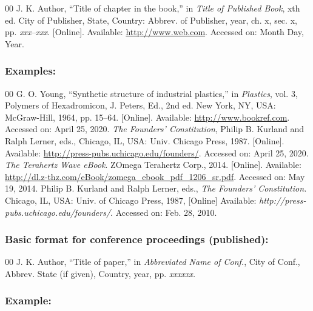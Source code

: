 \begin{thebibliography}{00}
 J. K. Author, ``Title of chapter in the book,'' in \textit{Title of Published Book}, xth ed. City of
Publisher, State, Country: Abbrev. of Publisher, year, ch. x, sec. x, pp.
\textit{xxx--xxx}. [Online]. Available: \underline {http://www.web.com}. Accessed on: Month
Day, Year.
\end{thebibliography}

\subsubsection*{Examples:}

\begin{thebibliography}{00}
 G. O. Young, ``Synthetic structure of industrial
plastics,'' in \emph{Plastics}, vol. 3, Polymers of Hexadromicon, J.
Peters, Ed., 2nd ed. New York, NY, USA: McGraw-Hill, 1964, pp. 15--64.
[Online]. Available: \underline{http://www.bookref.com}. Accessed on: April 25, 2020.
 \textit{The Founders' Constitution}, Philip B. Kurland and Ralph Lerner, eds., Chicago, IL, USA: Univ. Chicago Press, 1987. [Online]. Available: \underline {http://press-pubs.uchicago.edu/founders/}. Accessed on: April 25, 2020.
 \emph{The Terahertz Wave eBook}. ZOmega Terahertz
Corp., 2014. [Online]. Available: \underline{http://dl.z-thz.com/eBook/zomega\_ebook\_pdf\_1206\_sr.pdf}. Accessed on: May 19, 2014.
 Philip B. Kurland and Ralph Lerner, eds., \textit{The
Founders' Constitution. }Chicago, IL, USA: Univ. of Chicago Press, 1987, [Online] Available: \emph{http://press-pubs.uchicago.edu/founders/}. Accessed on: Feb. 28, 2010.
\end{thebibliography}

\subsubsection*{Basic format for conference proceedings (published):}

\begin{thebibliography}{00}
 J. K. Author, ``Title of paper,'' in \textit{Abbreviated Name of Conf.}, City of Conf., Abbrev. State (if
given), Country, year, pp. \textit{xxxxxx.}
\end{thebibliography}

\subsubsection*{Example:}

